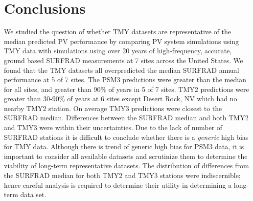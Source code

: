 \documentclass[conference]{IEEEtran}
\begin{document}
\section{Conclusions}
We studied the question of whether TMY datasets are representative of the median predicted PV performance by comparing PV system simulations using TMY data with simulations using over 20 years of high-frequency, accurate, ground based SURFRAD measurements at 7 sites across the United States. We found that the TMY datasets all overpredicted the median SURFRAD annual performance at 5 of 7 sites. The PSM3 predictions were greater than the median for all sites, and greater than 90\% of years in 5 of 7 sites. TMY2 predictions were greater than 30-90\% of years at 6 sites except Desert Rock, NV which had no nearby TMY2 station. On average TMY3 predictions were closest to the SURFRAD median. Differences between the SURFRAD median and both TMY2 and TMY3 were within their uncertainties. Due to the lack of number of SURFRAD stations it is difficult to conclude whether there is a \textit{generic} high bias for TMY data. Although there is trend of generic high bias for PSM3 data, it is important to consider all available datasets and scrutinize them to determine the viability of long-term representative datasets. The distribution of differences from the SURFRAD median for both TMY2 and TMY3 stations were indiscernible; hence careful analysis is required to determine their utility in determining a long-term data set.



\end{document}
